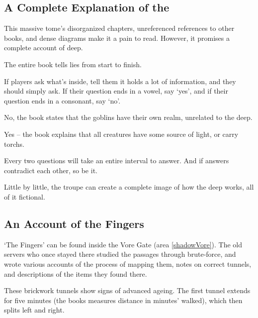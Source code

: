 \begin{multicols}{2}

\subsection{A Complete Explanation of the }
\label{bookOfDeep}

This massive tome's disorganized chapters, unreferenced references to other books, and dense diagrams make it a pain to read.
However, it promises a complete account of \gls{deep}.

The entire book tells lies from start to finish.

If players ask what's inside, tell them it holds a lot of information, and they should simply ask.
If their question ends in a vowel, say `yes', and if their question ends in a consonant, say `no'.

\begin{description}
  \itshape
  \item[Do goblins live in the \gls{deep}?]
  No, the book states that the goblins have their own realm, unrelated to the \gls{deep}.
  \item[Do the creatures down there just carry lights all the time?]
  Yes -- the book explains that all creatures have some source of light, or carry \glspl{torch}.
\end{description}

Every two questions will take an entire \gls{interval} to answer.
And if answers contradict each other, so be it.

Little by little, the troupe can create a complete image of how the \gls{deep} works, all of it fictional.

\subsection{An Account of the Fingers}
\label{bookOfFingers}

`The Fingers' can be found inside the Vore Gate (area \vref{shadowVore}).
The old \glspl{server} who once stayed there studied the passages through brute-force, and wrote various accounts of the process of mapping them, notes on correct tunnels, and descriptions of the items they found there.

\begin{exampletext}
  These brickwork tunnels show signs of advanced ageing.
  The first tunnel extends for five minutes (the books measures distance in minutes' walked), which then splits left and right.


\end{exampletext}
\end{multicols}
